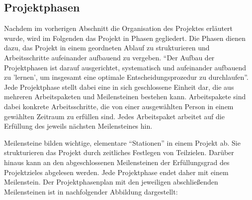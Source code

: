 \subsection{Projektphasen}
\label{sec:Projektphasen}

Nachdem im vorherigen Abschnitt die Organisation des Projektes erläutert wurde,
wird im Folgenden das Projekt in Phasen gegliedert. Die Phasen dienen 
dazu, das Projekt in einem geordneten Ablauf zu strukturieren und
Arbeitsschritte aufeinander aufbauend zu vergeben. "`Der Aufbau der
Projektphasen ist darauf ausgerichtet, systematisch und aufeinander aufbauend
zu 'lernen', um insgesamt eine optimale Entscheidungsprozedur zu
durchlaufen"'.
Jede Projektphase stellt dabei eine in sich geschlossene Einheit dar, die aus
mehreren Arbeitspaketen und Meilensteinen bestehen kann. Arbeitspakete sind
dabei konkrete Arbeitsschritte, die von einer ausgewählten Person in einem
gewählten Zeitraum zu erfüllen sind. Jedes Arbeitspaket arbeitet auf die
Erfüllung des jeweils nächsten Meilensteines hin.

Meilensteine bilden wichtige, elementare "`Stationen"' in einem Projekt ab. Sie
strukturieren das Projekt durch zeitliches Festlegen von Teilzielen.
Darüber hinaus kann an den abgeschlossenen Meilensteinen
der Erfüllungsgrad des Projektzieles abgelesen werden.
Jede Projektphase endet daher mit einem Meilenstein. Der Projektphasenplan mit
den jeweiligen abschließenden Meilensteinen ist in nachfolgender Abbildung
dargestellt:


